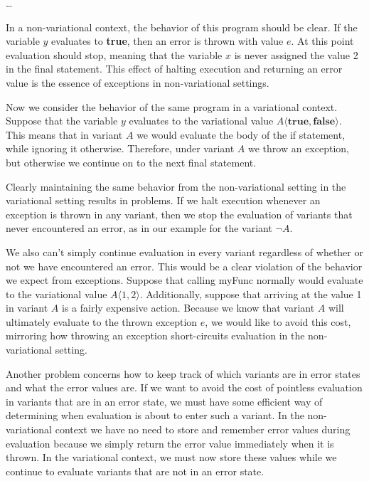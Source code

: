 \documentclass[letterpaper,10pt,onecolumn]{article}
\begin{document}
\begin{algorithmic}
\STATE \ldots
{}
\ENDIF
{}
\end{algorithmic}

In a non-variational context, the behavior of this program should be clear.
If the variable $y$ evaluates to \textbf{true}, then an error is thrown with value
$e$. At this point evaluation should stop, meaning that the variable $x$ is never
assigned the value 2 in the final statement. This effect of halting execution and
returning an error value is the essence of exceptions in non-variational settings.

Now we consider the behavior of the same program in a variational context.
Suppose that the variable $y$ evaluates to the variational value
$A \langle \textbf{true}, \textbf{false} \rangle$. This means that in variant $A$ we
would evaluate the body of the if statement, while ignoring it otherwise. Therefore,
under variant $A$ we throw an exception, but otherwise we continue on to the next
final statement.

Clearly maintaining the same behavior from the non-variational setting in the variational setting
results in problems. If we halt execution whenever an exception is
thrown in any variant, then we stop the evaluation of variants that never encountered an error,
as in our example for the variant $\neg A$.

We also can't simply continue evaluation
in every variant regardless of whether or not we have encountered an error. This would be
a clear violation of the behavior we expect from exceptions.
Suppose that calling myFunc normally would evaluate to the variational value $A\langle 1, 2 \rangle$.
Additionally, suppose that arriving at the value 1 in variant $A$ is a fairly expensive action.
Because we know that variant $A$ will ultimately evaluate to the thrown exception $e$, we would
like to avoid this cost, mirroring how throwing an exception short-circuits evaluation in the
non-variational setting. 

Another problem concerns how to keep track of which variants are in error states and what
the error values are. If we want to avoid the cost of pointless evaluation in variants that are in an error
state, we must have some efficient way of determining when evaluation is about to enter such a variant.
In the non-variational context we have no need to store and remember error values during evaluation
because we simply return the error value immediately when it is thrown. In the variational context, we
must now store these values while we continue to evaluate variants that are not in an error state.
\end{document}
